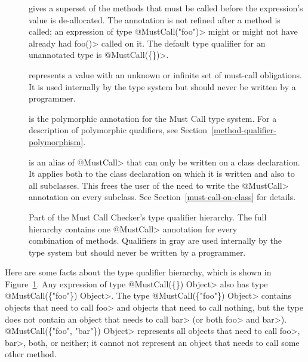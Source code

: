 \begin{description}

\item[]
  gives a superset of the methods that
  must be called before the expression's value is de-allocated.
  The annotation is not refined after a method is called; an expression of
  type \<@MustCall("foo")> might or might not have already had \<foo()>
  called on it.
  The default type qualifier for an unannotated type is \<@MustCall(\{\})>.

\item[]
  represents a value with an unknown or infinite set of must-call obligations.
  It is used internally by the type system but should never be written by a
  programmer.

\item[]
  is the polymorphic annotation for the Must Call type system.
  For a description of polymorphic qualifiers, see
  Section~\ref{method-qualifier-polymorphism}.

\item[]
  is an alias of \<@MustCall> that can only be written on a class declaration.
  It applies both to the class declaration on which it is written and also to all subclasses.
  This frees the user of the need to write the \<@MustCall> annotation on every subclass.
  See Section~\ref{must-call-on-class} for details.

\end{description}

\begin{figure}
\caption{Part of the Must Call Checker's type
qualifier hierarchy.  The full hierarchy contains one \<@MustCall> annotation
for every combination of methods.
Qualifiers in gray are used internally by the type system but should
never be written by a programmer.}
\label{fig-must-call-hierarchy}
\end{figure}

Here are some facts about the type qualifier hierarchy, which is shown in
Figure~\ref{fig-must-call-hierarchy}.
Any expression of type \<@MustCall(\{\}) Object> also has type
\<@MustCall(\{"foo"\}) Object>.
The type \<@MustCall(\{"foo"\}) Object>
contains objects that need to call \<foo> and objects that need to call
nothing, but the type does not contain an
object that needs to call \<bar> (or both \<foo> and \<bar>).
\<@MustCall(\{"foo", "bar"\}) Object> represents all objects that need to
call \<foo>, \<bar>, both, or neither; it cannot not represent an object that needs
to call some other method.


